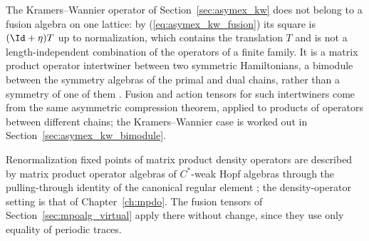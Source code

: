 \begin{remark}%
    \label{rem:mpoalg_kramers_wannier}
    The Kramers--Wannier operator of Section~\ref{sec:asymex_kw} does not
    belong to a fusion algebra on one lattice: by
    (\ref{eq:asymex_kw_fusion}) its square is $(\Id+\eta)T$ up to
    normalization, which contains the translation $T$ and is not a
    length-independent combination of the operators of a finite family.
    It is a matrix product operator intertwiner between two symmetric
    Hamiltonians, a bimodule between the symmetry algebras of the primal and
    dual chains, rather than a symmetry of one of them
    \cite{Lootens2023Dualities,Lootens2021MPOStringNet}. Fusion and action
    tensors for such intertwiners come from the same asymmetric compression
    theorem, applied to products of operators between different chains; the
    Kramers--Wannier case is worked out in
    Section~\ref{sec:asymex_kw_bimodule}.
\end{remark}

\begin{remark}%
    \label{rem:mpoalg_mpdo}
    Renormalization fixed points of matrix product density operators are
    described by matrix product operator algebras of $C^*$-weak Hopf algebras
    through the pulling-through identity of the canonical regular element
    \cite{RuizDeAlarcon2024MPOAlgebrasII}; the density-operator setting is
    that of Chapter~\ref{ch:mpdo}. The fusion tensors of
    Section~\ref{sec:mpoalg_virtual} apply there without change, since they
    use only equality of periodic traces.
\end{remark}
